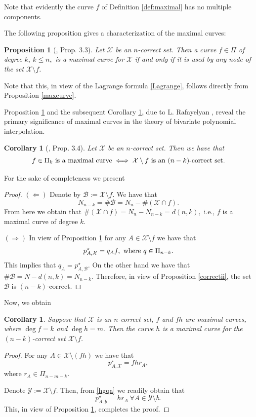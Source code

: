 \documentclass[a4paper,12pt]{article}
\newtheorem{proposition}[lemma]{Proposition}
\newtheorem{corollary}[lemma]{Corollary}
\theoremstyle{definition}
\numberwithin{equation}{section}
\numberwithin{figure}{section}
\newcommand{\Bset}{\mathcal{B}}
\newcommand{\Xset}{\mathcal{X}}
\newcommand{\Yset}{\mathcal{Y}}
\begin{document}
Note that evidently the curve $f$ of Definition \ref{def:maximal} has no multiple components.



The following proposition gives a characterization of the maximal curves:
\begin{proposition}[\cite{Raf}, Prop. 3.3] \label{maxcor}
Let $\Xset$ be an $n$-correct set. Then
a curve $f\in\Pi$ of degree $k,\ k\le n,$ is a maximal curve for $\Xset$ if and only if 
it is used by any node of the set $\Xset\setminus f.$
\end{proposition} 

Note that this, in view of the Lagrange formula \eqref{Lagrange}, follows directly from Proposition \ref{maxcurve}. 

Proposition \ref{maxcor} and the subsequent Corollary \ref{maxtim}, due to L. Rafayelyan \cite{Raf}, reveal the primary significance of maximal curves in the theory of bivariate polynomial interpolation. 

\begin{corollary}[\cite{Raf}, Prop. 3.4] \label{maxtim}  Let $\Xset$ be an $n$-correct set. Then we have that 
\begin{equation}\label{maxmax}
f\in\Pi_k \hbox{ is a maximal curve}  \iff \Xset\setminus f  \hbox{ is an $(n-k)$-correct set.}\end{equation} 
\end{corollary}
For the sake of completeness we present
\begin{proof} 
 $(\Leftarrow)$ 
Denote by $\Bset:=\Xset\setminus f.$ We have that
\begin{equation}\label{nnk}N_{n-k}=\#\Bset=N_n-\#(\Xset\cap f).\end{equation}
From here we obtain that $\#(\Xset\cap f)=N_n-N_{n-k}=d(n,k),$ i.e., $f$ is a maximal curve of degree $k.$

$(\Rightarrow)$
In view of  Proposition \ref{maxcor}  for any $A\in \Xset\setminus f$ we have that
$$p^\star_{A,\Xset} = q_Af,\ \hbox{where}\ q\in\Pi_{n-k}.$$
This implies that
$q_A= p^\star_{A,\Bset}.$ On the other hand we have that $\#\Bset=N-d(n,k)=N_{n-k}.$ Therefore, in view of Proposition \ref{correctii}, the set $\Bset$ is $(n-k)$-correct.
\end{proof} 

Now, we obtain  

\begin{corollary}\label{maxhq} Suppose that $\Xset$ is an $n$-correct set, $f$ and $fh$ are
maximal curves, where   $\deg f=k$ and $\deg h=m.$
Then 
the curve $h$ is a maximal curve for the $(n-k)$-correct set $\Xset\setminus f.$
\end{corollary}
\begin{proof}
For any $A\in \Xset\setminus (fh)$ we have that 
\begin{equation} \label{hgqa} p_{A,\Xset}^\star = fhr_A,\end{equation} 
where $r_A\in\Pi_{n-m-k}.$

Denote $\Yset:=\Xset\setminus f.$ 
Then, from \eqref{hgqa} we readily obtain that
$$p_{A,\Yset}^\star = hr_A\ \forall A\in\Yset\setminus h.$$
This, in view of Proposition \ref{maxcor}, completes the proof.
\end{proof}
\end{document}
